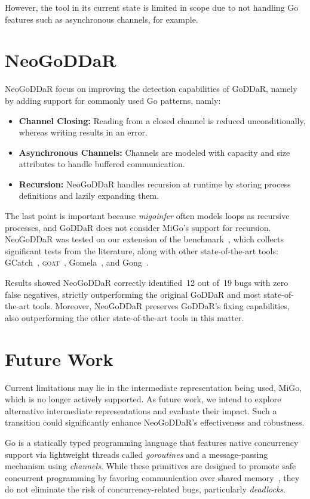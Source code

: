 \documentclass[runningheads]{llncs}
\begin{document}
However, the tool in its current state is limited in scope due to not handling Go features such as asynchronous channels, for example.


\section{NeoGoDDaR}
NeoGoDDaR focus on improving the detection capabilities of GoDDaR, namely by adding support for commonly used Go patterns, namly: 
\begin{itemize}
    \item \textbf{Channel Closing:} Reading from a closed channel is reduced unconditionally, whereas writing results in an error.
    \item \textbf{Asynchronous Channels:} Channels are modeled with capacity and size attributes to handle buffered communication.
    \item \textbf{Recursion:} NeoGoDDaR handles recursion at runtime by storing process definitions and lazily expanding them.
\end{itemize}
The last point is important because \textit{migoinfer} often models loops as recursive processes, and GoDDaR does not consider MiGo's support for recursion.
NeoGoDDaR was tested on our extension of the benchmark~\cite{BugCollection}, which collects significant tests from the literature, along with other state-of-the-art tools: GCatch~\cite{GCatch}, \textsc{goat}~\cite{Goat}, Gomela~\cite{Gomela}, and Gong~\cite{Gong}.

Results showed NeoGoDDaR correctly identified~12 out of~19 bugs with zero false negatives, strictly outperforming the original GoDDaR and most state-of-the-art tools.
Moreover, NeoGoDDaR preserves GoDDaR's fixing capabilities, also outperforming the other state-of-the-art tools in this matter.

\section{Future Work}
Current limitations may lie in the intermediate representation being used, MiGo, which is no longer actively supported.
As future work, we intend to explore alternative intermediate representations and evaluate their impact.
Such a transition could significantly enhance NeoGoDDaR’s effectiveness and robustness.

\iffalse
Go is a statically typed programming language that features native concurrency support via lightweight threads called \emph{goroutines} and a message-passing mechanism using \emph{channels}.
While these primitives are designed to promote safe concurrent programming by favoring communication over shared memory~\cite{GoProverb,EffectiveGo}, they do not eliminate the risk of concurrency-related bugs, particularly \emph{deadlocks}.
\end{document}
